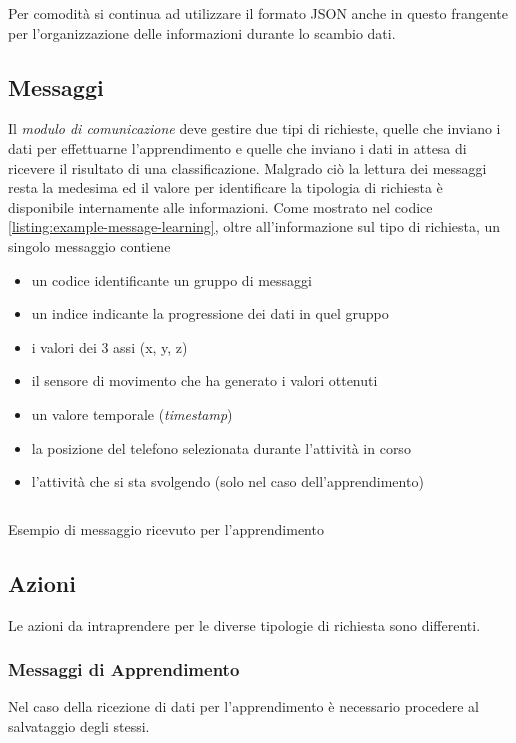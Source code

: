 Per comodità si continua ad utilizzare il formato JSON anche in questo frangente per l'organizzazione delle informazioni durante lo scambio dati.


\subsection{Messaggi}
Il \textit{modulo di comunicazione} deve gestire due tipi di richieste, quelle che inviano i dati per effettuarne l'apprendimento e quelle che inviano
i dati in attesa di ricevere il risultato di una classificazione. Malgrado ciò la lettura dei messaggi resta la medesima ed il 
valore per identificare la tipologia di richiesta è disponibile internamente alle informazioni.
\vspace{5mm} %
\newline
Come mostrato nel codice \ref{listing:example-message-learning}, oltre all'informazione sul tipo di richiesta, un singolo messaggio contiene 
\begin{itemize}
    \item un codice identificante un gruppo di messaggi
    \item un indice indicante la progressione dei dati in quel gruppo
    \item i valori dei 3 assi (x, y, z)
    \item il sensore di movimento che ha generato i valori ottenuti
    \item un valore temporale (\textit{timestamp})
    \item la posizione del telefono selezionata durante l'attività in corso
    \item l'attività che si sta svolgendo (solo nel caso dell'apprendimento)
\end{itemize}
\vfill
\begin{listing}[H] 
    \inputminted[frame=single,framesep=10pt]{json}{assets/snippets/server/receiver/message.json}
    \caption{Esempio di messaggio ricevuto per l'apprendimento}
    \label{listing:example-message-learning}
\end{listing}

\newpage
\subsection{Azioni}
Le azioni da intraprendere per le diverse tipologie di richiesta sono differenti. 

\subsubsection{Messaggi di Apprendimento}
Nel caso della ricezione di dati per l'apprendimento è necessario procedere al salvataggio degli stessi.

